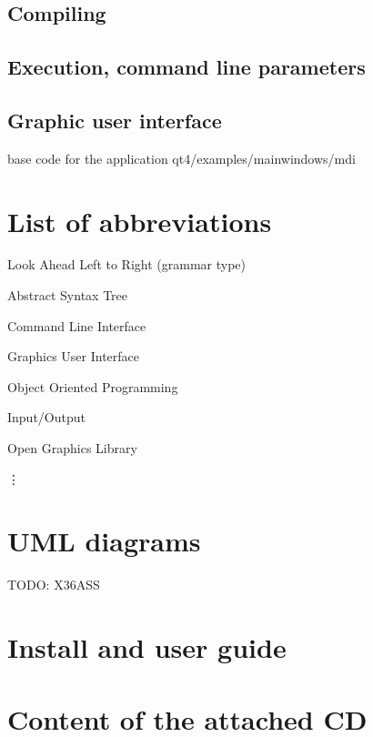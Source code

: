 \documentclass[11pt,twoside,a4paper]{book}
\begin{document}
\section{Compiling}
\section{Execution, command line parameters}
\section{Graphic user interface}

base code for the application qt4/examples/mainwindows/mdi



\chapter{List of abbreviations}
\begin{description}
\setlength{\labelwidth}{2.5cm}
\setlength{\itemindent}{1.5cm}
\item[LALR] Look Ahead Left to Right (grammar type)
\item[AST] Abstract Syntax Tree
\item[CLI] Command Line Interface
\item[GUI] Graphics User Interface
\item[OOP] Object Oriented Programming
\item[I/O] Input/Output
\item[OpenGL] Open Graphics Library
\end{description}
\vdots



\chapter{UML diagrams}

TODO: X36ASS



\chapter{Install and user guide}



\chapter{Content of the attached CD}
\end{document}
